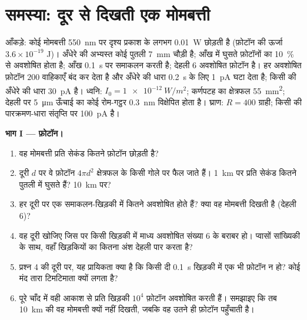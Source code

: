 \section{समस्या: दूर से दिखती एक मोमबत्ती}

\begin{problem}
\label{pb:b3:sensory-systems:1}
आँकड़े: कोई मोमबत्ती \qty{550}{nm} पर दृश्य प्रकाश के लगभग
\qty{0.01}{W} छोड़ती है (फ़ोटॉन की ऊर्जा $3.6\times 10^{-19}$ J)।
अँधेरे की अभ्यस्त कोई पुतली \qty{7}{mm} चौड़ी है; आँख में घुसते
फ़ोटॉनों का \qty{10}{\%}  से अवशोषित होता है; आँख
\qty{0.1}{s} पर समाकलन करती है; देहली $6$ अवशोषित फ़ोटॉन है। हर
अवशोषित फ़ोटॉन $200$ वाहिकाएँ बंद कर देता है और अँधेरे की धारा
\qty{0.2}{s} के लिए \qty{1}{pA} घटा देता है; किसी  की अँधेरे की
धारा \qty{30}{pA} है। ध्वनि: $I_{0} =
\qty{1e-12}{W/m^2}$; कर्णपटह का क्षेत्रफल \qty{55}{mm^2}; देहली पर
\qty{5}{\micro m} ऊँचाई का कोई रोम-गट्ठर \qty{0.3}{nm} विक्षेपित होता
है। घ्राण: $R = 400$ ग्राही; किसी  की पारक्रमण-धारा संतृप्ति
पर \qty{100}{pA} है।

\medskip
\noindent\textbf{भाग I --- फ़ोटॉन।}
\begin{enumerate}
  \item वह मोमबत्ती प्रति सेकंड कितने फ़ोटॉन छोड़ती है?
  \item दूरी $d$ पर वे फ़ोटॉन $4\pi d^{2}$ क्षेत्रफल के किसी गोले पर
        फैल जाते हैं। \qty{1}{km} पर प्रति सेकंड कितने पुतली में घुसते
        हैं? \qty{10}{km} पर?
  \item हर दूरी पर एक समाकलन-खिड़की में कितने अवशोषित होते हैं? क्या वह
        मोमबत्ती दिखती है (देहली $6$)?
  \item वह दूरी खोजिए जिस पर किसी खिड़की में माध्य अवशोषित संख्या
        $6$ के बराबर हो। प्वासों सांख्यिकी के साथ, वहाँ खिड़कियों का
        कितना अंश देहली पार करता है?
  \item प्रश्न 4 की दूरी पर, यह प्रायिकता क्या है कि किसी दी
        \qty{0.1}{s} खिड़की में एक भी फ़ोटॉन न हो? कोई मंद तारा
        टिमटिमाता क्यों लगता है?
  \item पूरे चाँद में वही  आकाश से प्रति खिड़की $10^{4}$ फ़ोटॉन
        अवशोषित करती हैं। समझाइए कि तब \qty{10}{km} की वह मोमबत्ती
        क्यों नहीं दिखती, जबकि वह उतने ही फ़ोटॉन पहुँचाती है।
\end{enumerate}


\end{problem}
